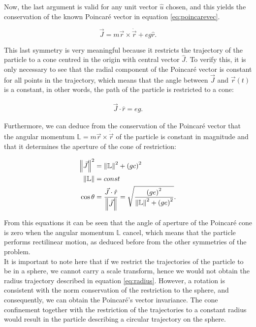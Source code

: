 Now, the last argument is valid for any unit vector $\hat{u}$ chosen, and this yields the conservation of the  known Poincar\'e vector in equation \eqref{eq:poincarevec}.

\begin{equation}
\vec{J} = m\vec{r}\times\dot{\vec{r}}+ eg\hat{r}.
\label{eq:poincarevec}
\end{equation}

This last symmetry is very meaningful because it restricts the trajectory of the particle to a cone centred in the origin with central vector $\hat{J}$. To verify this, it is only necessary to see that the radial component of the Poincar\'e vector is constant for all points in the trajectory, which means that the angle between $\vec{J}$ and $\vec{r}(t)$ is a constant, in other words, the path of the particle is restricted to a cone:

\begin{align*}
\vec{J}\cdot\hat{r} = eg.
\end{align*}

Furthermore, we can deduce from the conservation of the Poincar\'e vector that the angular momentum $\mathbb{L}= m\vec{r}\times\dot{\vec{r}}$ of the particle is constant in magnitude and that it determines the aperture of the cone of restriction:

\begin{equation}
\begin{aligned}
\left\lVert \vec{J} \right\rVert^2 &= \left\lVert \mathbb{L} \right\rVert^2 +\left( gc \right)^2\\
\left\lVert \mathbb{L} \right\rVert &= const\\
\cos{\theta} &= \frac{\vec{J}\cdot\hat{r}}{\left\lVert \vec{J} \right\rVert} = \sqrt{\frac{\left( ge \right)^2}{\left\lVert \mathbb{L} \right\rVert^2 +\left( ge \right)^2}}.
\end{aligned}
\label{eq:poincarecone}
\end{equation}

From this equations it can be seen that the angle of aperture of the Poincar\'e cone is zero when the angular momentum $\mathbb{L}$ cancel, which means that the particle performs rectilinear motion, as deduced before from the other symmetries of the problem.\\

It is important to note here that if we restrict the trajectories of the particle to be in a sphere, we cannot carry a scale transform, hence we would not obtain the radius trajectory described in equation \eqref{eq:radius}. However, a rotation is consistent with the norm conservation of the restriction to the sphere, and consequently, we can obtain the Poincar\'e's vector invariance. The cone confinement together with the restriction of the trajectories to a constant radius would result in the particle describing a circular trajectory on the sphere.\\ 

